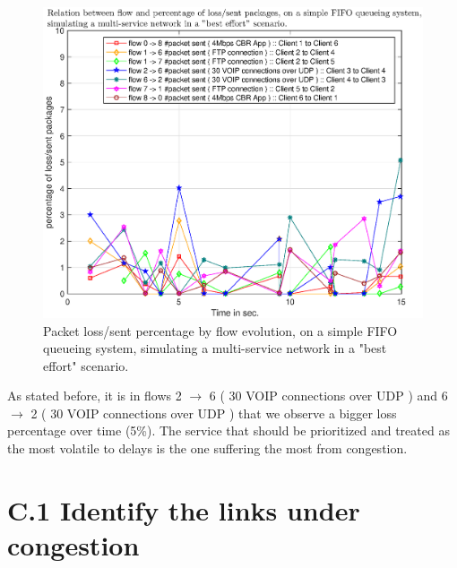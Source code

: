 \documentclass[conference,compsoc]{IEEEtran}
\begin{document}
     \begin{figure}[H]
     \centering
     \includegraphics[width=1\columnwidth]{EPS/B/loss_sent_percentage_b1.eps}
     \caption{Packet loss/sent percentage by flow evolution, on a simple FIFO queueing system, simulating a multi-service network in a "best effort" scenario.}
     \label{graph:loss_sent_percentage_b1}
     \end{figure}


     As stated before, it is in flows 2 $ \rightarrow $ 6 ( 30 VOIP connections over UDP ) and 6 $ \rightarrow $ 2 ( 30 VOIP connections over UDP ) that we observe a bigger loss percentage over time (5\%). The service that should be prioritized and treated as the most volatile to delays is the one suffering the most from congestion. 


     \section{C.1 Identify the links under congestion}
\end{document}
